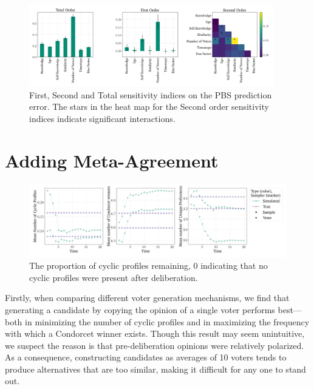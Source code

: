\begin{figure}[ht]
	\begin{center}
		\includegraphics[width=0.95\textwidth]{Figures/senstivity_analysis.png}
	\end{center}
	\caption{First, Second and Total sensitivity indices on the PBS prediction error. The stars in the heat map for the Second order sensitivity indices indicate significant interactions. }\label{fig:sensitivty_pbs}
\end{figure}


\section{Adding Meta-Agreement}

\begin{figure}[htbp]
	\centering
		\centering
		\includegraphics[width=\textwidth]{Figures/three_measures.png
		}
		\caption{The proportion of cyclic profiles remaining, 0 indicating that no cyclic profiles were present after deliberation.}
		\label{fig:degroot_cyclic}
\end{figure}

Firstly, when comparing different voter generation mechanisms, we find that generating a candidate by copying the opinion of a single voter performs best—both in minimizing the number of cyclic profiles and in maximizing the frequency with which a Condorcet winner exists. Though this result may seem unintuitive, we suspect the reason is that pre-deliberation opinions were relatively polarized. As a consequence, constructing candidates as averages of 10 voters tends to produce alternatives that are too similar, making it difficult for any one to stand out.

